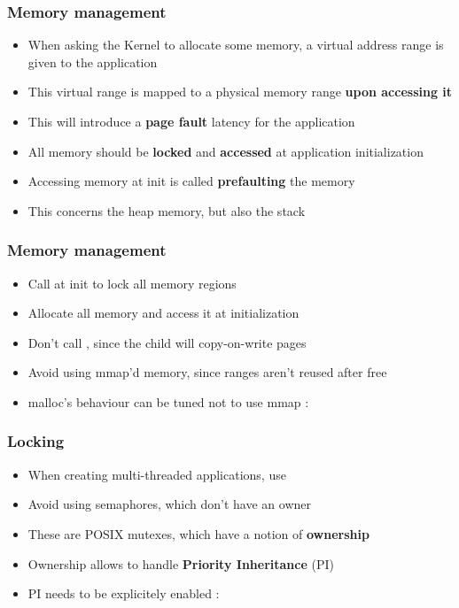 
\begin{frame}
	\frametitle{Memory management}
	\begin{itemize}
		\item When asking the Kernel to allocate some memory, a virtual address range is given to the application
		\item This virtual range is mapped to a physical memory range \textbf{upon accessing it}
		\item This will introduce a \textbf{page fault} latency for the application
		\item All memory should be \textbf{locked} and \textbf{accessed} at application initialization
		\item Accessing memory at init is called \textbf{prefaulting} the memory
		\item This concerns the heap memory, but also the stack
	\end{itemize}
\end{frame}

\begin{frame}
	\frametitle{Memory management}
	\begin{itemize}
		\item Call  at init to lock all memory regions
		\item Allocate all memory and access it at initialization
		\item Don't call , since the child will copy-on-write pages
		\item Avoid using mmap'd memory, since ranges aren't reused after free
		\item malloc's behaviour can be tuned not to use mmap : 
	\end{itemize}
\end{frame}

\begin{frame}
	\frametitle{Locking}
	\begin{itemize}
		\item When creating multi-threaded applications, use 
		\item Avoid using semaphores, which don't have an owner
		\item These are POSIX mutexes, which have a notion of \textbf{ownership}
		\item Ownership allows to handle \textbf{Priority Inheritance} (PI)
		\item PI needs to be explicitely enabled : 
	\end{itemize}
\end{frame}

